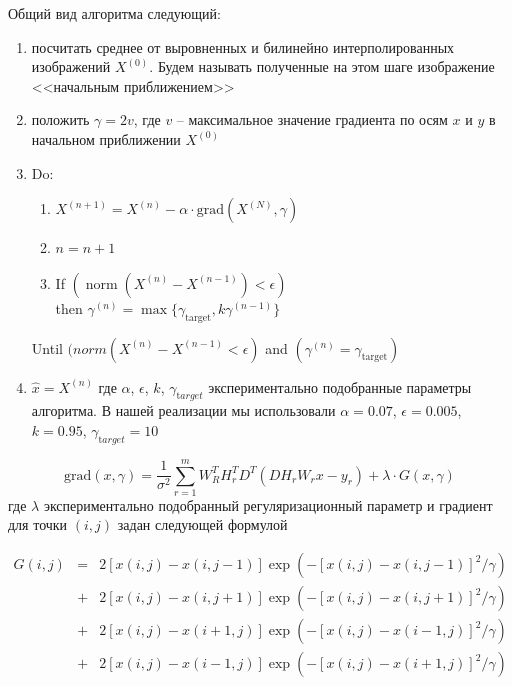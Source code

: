 Общий вид алгоритма следующий:
\begin{enumerate}
  \item посчитать среднее от выровненных и билинейно интерполированных изображений $X^{(0)}$. Будем называть полученные на этом
    шаге изображение <<начальным приближением>>
  \item положить $\gamma = 2v$, где $v$ -- максимальное значение градиента по осям $x$ и $y$ в начальном приближении
    $X^{(0)}$
  \item Do:
    \begin{enumerate}
      \item $X^{(n+1)} = X^{(n)} - \alpha\cdot\mathrm{grad}(X^{(N)}, \gamma) $
      \item $n=n+1$
      \item If $(\operatorname{norm}(X^{(n)}-X^{(n-1)}) < \epsilon)$\\
        then $\gamma^{(n)} = \max \{\gamma_{\mathrm{target}}, k\gamma^{(n-1)}\}$
    \end{enumerate}
    Until $(norm(X^{(n)}-X^{(n-1)} < \epsilon)$ and $(\gamma^{(n)} = \gamma_{\mathrm{target}})$

  \item $ \hat{x} = X^{(n)}$
    где $\alpha$, $\epsilon$, $k$, $\gamma_{\mathrm target}$ экспериментально подобранные параметры алгоритма. В нашей
    реализации мы использовали $\alpha = 0.07$, $ \epsilon=0.005$, $ k=0.95$, $ \gamma_{\mathrm target}=10$
\end{enumerate}
$$
\mathrm{grad}(x, \gamma) = \frac{1}{\sigma^2} \sum^m_{r=1} W^T_R H^T_r D^T (D H_r W_r x-y_r) + \lambda \cdot G(x, \gamma)
$$
где $\lambda$ экспериментально подобранный регуляризационный параметр и градиент для точки $(i,j)$ задан следующей формулой

$$
\begin{array}{rcl}
 G(i,j) & = & 2\left[x(i,j)-x(i,j-1)\right] \exp\left(-[ x(i,j)-x(i,j-1) ]^2/\gamma \right) \\
& + & 2\left[x(i,j)-x(i,j+1)\right] \exp\left(-[ x(i,j)-x(i,j+1) ]^2/\gamma \right) \\
& + & 2\left[x(i,j)-x(i+1,j)\right] \exp\left(-[ x(i,j)-x(i-1,j) ]^2/\gamma \right) \\
& + & 2\left[x(i,j)-x(i-1,j)\right] \exp\left(-[ x(i,j)-x(i+1,j) ]^2/\gamma \right)
\end{array}
$$


